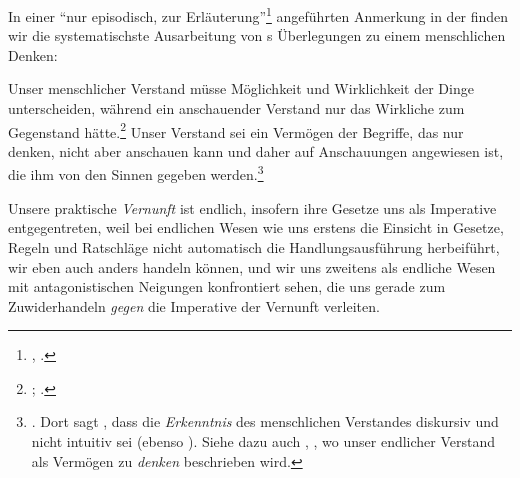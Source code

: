 In einer \enquote{nur episodisch, zur
Erläuterung}\footnote{\cite[][\S~76]{Kant:KritikderUrteilskraft2009}, \cite[][V:
401.6--7]{Kant:GesammelteWerke1900ff.}.} angeführten Anmerkung in der
 finden wir die systematischste Ausarbeitung von
s Überlegungen zu einem menschlichen Denken:
\begin{nummerierung}
 \item Unser menschlicher Verstand müsse Möglichkeit und Wirklichkeit der Dinge
 unterscheiden, während ein anschauender Verstand nur das Wirkliche zum
 Gegenstand hätte.\footnote{\cite[Vgl.][\S~76]{Kant:KritikderUrteilskraft2009};
 \cite[][V: 401.31--403.19]{Kant:GesammelteWerke1900ff.}.} Unser
 Verstand sei ein Vermögen der Begriffe, das nur denken, nicht aber anschauen
 kann und daher auf Anschauungen angewiesen ist, die ihm von den Sinnen
 gegeben werden.\footnote{\cite[Vgl.][B
 92\,f.,]{Kant:KritikderreinenVernunft2003} \cite[][III:
 85.10--16]{Kant:GesammelteWerke1900ff.}. Dort sagt , dass
 die \emph{Erkenntnis} des menschlichen Verstandes diskursiv und nicht intuitiv
 sei \mkbibparens{ebenso \cite[][B 311\,f.,]{Kant:KritikderreinenVernunft2003}
 \cite[][III: 166.37--167.5]{Kant:GesammelteWerke1900ff.}}.
 Siehe dazu auch \cite[][B 135]{Kant:KritikderreinenVernunft2003}, \cite[][III:
 110.26--29]{Kant:GesammelteWerke1900ff.}, wo unser endlicher Verstand als
 Vermögen zu \emph{denken} beschrieben wird.}
 
 \item Unsere praktische \emph{Vernunft} ist endlich, insofern ihre Gesetze uns
 als Imperative entgegentreten, weil bei endlichen Wesen wie uns erstens die
 Einsicht in Gesetze, Regeln und Ratschläge nicht automatisch die
 Handlungsausführung herbeiführt, wir eben auch anders handeln können, und
 wir uns zweitens als endliche Wesen mit antagonistischen Neigungen
 konfrontiert sehen, die uns  gerade zum Zuwiderhandeln \emph{gegen}
 die Imperative der Vernunft verleiten.


\end{nummerierung}

